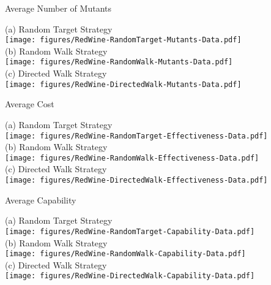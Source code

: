 \documentclass[preprint,1p,authoryear,times]{elsarticle}
\begin{document}
\begin{table}[htbp]
	\caption{Average Number of Mutants}	\label{tab:RedWineMutants}
	\begin{center}
	\scriptsize{(a) Random Target Strategy}\\
	\texttt{[image: figures/RedWine-RandomTarget-Mutants-Data.pdf]}\\
	\scriptsize{(b) Random Walk Strategy}\\
	\texttt{[image: figures/RedWine-RandomWalk-Mutants-Data.pdf]}\\
	\scriptsize{(c) Directed Walk Strategy}\\
	\texttt{[image: figures/RedWine-DirectedWalk-Mutants-Data.pdf]}\\
	\end{center}
\end{table}

\begin{table}[htbp]
	\caption{Average Cost}	\label{tab:RedWineEffectiveness}
	\begin{center}
	\scriptsize{(a) Random Target Strategy}\\
	\texttt{[image: figures/RedWine-RandomTarget-Effectiveness-Data.pdf]}\\
	\scriptsize{(b) Random Walk Strategy}\\
	\texttt{[image: figures/RedWine-RandomWalk-Effectiveness-Data.pdf]}\\
		\scriptsize{(c) Directed Walk Strategy}\\
	\texttt{[image: figures/RedWine-DirectedWalk-Effectiveness-Data.pdf]}\\
	\end{center}
\end{table}

\begin{table}[htbp]
	\caption{Average Capability}	\label{tab:RedWineCapability}
	\begin{center}
	\scriptsize{(a) Random Target Strategy}\\
	\texttt{[image: figures/RedWine-RandomTarget-Capability-Data.pdf]}\\
	\scriptsize{(b) Random Walk Strategy}\\
	\texttt{[image: figures/RedWine-RandomWalk-Capability-Data.pdf]}\\
		\scriptsize{(c) Directed Walk Strategy}\\
	\texttt{[image: figures/RedWine-DirectedWalk-Capability-Data.pdf]}\\
	\end{center}
\end{table}
\end{document}
